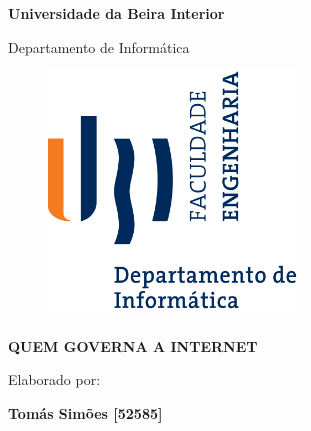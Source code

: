 \thispagestyle{empty}
\setcounter{page}{-1}

\begin{center}
  \begin{Huge}
    \textbf{Universidade da Beira Interior}
  \end{Huge}
\end{center}

\begin{center}
  \begin{Huge}
    Departamento de Informática
  \end{Huge}
\end{center}

\vspace{0,07cm}
\begin{figure}[!htb]
  \centering
  \includegraphics[width=191pt]{images/ubi-fe-di.png}
\end{figure}

\vspace{0.5cm}
\begin{center}
  \begin{Large}
    \textbf{QUEM GOVERNA A INTERNET}
  \end{Large}
\end{center}


\vspace{0.5cm}
\begin{center}
  \begin{normalsize}
    \begin{large}
      Elaborado por:
    \end{large}
  \end{normalsize}
\end{center}

\vspace{0.2cm}
\begin{center}
  \begin{large}
    \textbf{Tomás Simões [52585]}
  \end{large}
\end{center}

